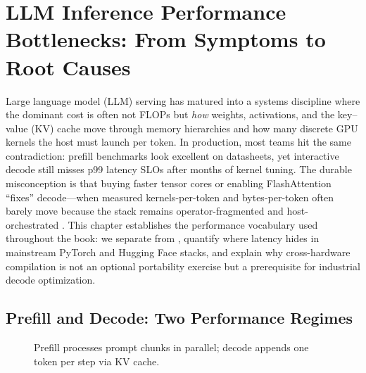 \chapter{LLM Inference Performance Bottlenecks: From Symptoms to Root Causes}
\label{chap:decode_bottlenecks}

Large language model (LLM) serving has matured into a systems discipline where the dominant cost is often not FLOPs but \emph{how} weights, activations, and the key--value (KV) cache move through memory hierarchies and how many discrete GPU kernels the host must launch per token.
In production, most teams hit the same contradiction: prefill benchmarks look excellent on datasheets, yet interactive decode still misses p99 latency SLOs after months of kernel tuning.
The durable misconception is that buying faster tensor cores or enabling FlashAttention ``fixes'' decode---when measured kernels-per-token and bytes-per-token often barely move because the stack remains operator-fragmented and host-orchestrated \citep{taxbreak2026,memoryfloor2026}.
This chapter establishes the performance vocabulary used throughout the book: we separate  from , quantify where latency hides in mainstream PyTorch and Hugging Face stacks, and explain why cross-hardware compilation is not an optional portability exercise but a prerequisite for industrial decode optimization.

\section{Prefill and Decode: Two Performance Regimes}
\label{sec:prefill_decode}
\begin{figure}[t]
\centering
{}
\caption{Prefill processes prompt chunks in parallel; decode appends one token per step via KV cache.}
\label{fig:prefill_decode_pipeline}
\end{figure}


